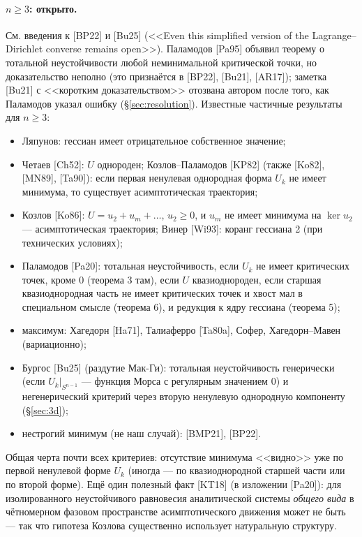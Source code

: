 \documentclass[11pt,a4paper]{article}
\theoremstyle{definition}
\begin{document}
\paragraph{$n\ge3$: открыто.} См. введения к [BP22] и [Bu25] (<<Even this simplified version of the
Lagrange--Dirichlet converse remains open>>). Паламодов [Pa95] объявил теорему о тотальной
неустойчивости любой неминимальной критической точки, но доказательство неполно (это признаётся
в [BP22], [Bu21], [AR17]); заметка [Bu21] с <<коротким доказательством>> отозвана автором после того,
как Паламодов указал ошибку (\S\ref{sec:resolution}). Известные частичные результаты для $n\ge3$:
\begin{itemize}[leftmargin=*]
\item Ляпунов: гессиан имеет отрицательное собственное значение;
\item Четаев [Ch52]: $U$ однороден; Козлов--Паламодов [KP82] (также [Ko82], [MN89],
[Ta90]): если первая ненулевая однородная форма $U_k$ не имеет минимума, то существует асимптотическая
траектория;
\item Козлов [Ko86]: $U=u_2+u_m+\dots$, $u_2\ge0$, и $u_m$ не имеет минимума на $\ker u_2$ ---
асимптотическая траектория; Винер [Wi93]: коранг гессиана 2 (при технических условиях);
\item Паламодов [Pa20]: тотальная неустойчивость, если $U_k$ не имеет критических точек, кроме $0$
(теорема 3 там), если $U$ квазиоднороден, если старшая квазиоднородная часть не имеет критических
точек и хвост мал в специальном смысле (теорема 6), и редукция к ядру гессиана (теорема 5);
\item максимум: Хагедорн [Ha71], Талиаферро [Ta80a], Софер, Хагедорн--Мавен (вариационно);
\item Бургос [Bu25] (раздутие Мак-Ги): тотальная неустойчивость генерически
(если $U_k|_{S^{n-1}}$ --- функция Морса с регулярным значением $0$) и негенерический критерий
через вторую ненулевую однородную компоненту (\S\ref{sec:3d});
\item нестрогий минимум (не наш случай): [BMP21], [BP22].
\end{itemize}
Общая черта почти всех критериев: отсутствие минимума <<видно>> уже по первой ненулевой форме $U_k$
(иногда --- по квазиоднородной старшей части или по второй форме).
Ещё один полезный факт [KT18] (в изложении [Pa20]): для изолированного неустойчивого равновесия
аналитической системы \emph{общего вида} в чётномерном фазовом пространстве асимптотического
движения может не быть --- так что гипотеза Козлова существенно использует натуральную структуру.
\end{document}
